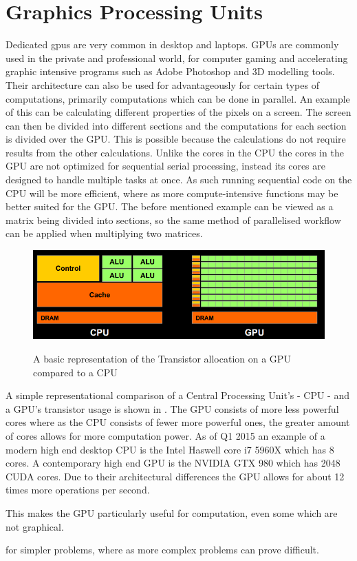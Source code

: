 \section{Graphics Processing Units}
\label{sec:GPU}
Dedicated \glspl{gpu} are very common in desktop and laptops. \citep{STEAMHW}
GPUs are commonly used in the private and professional world, for computer gaming and accelerating graphic intensive programs such as Adobe Photoshop and 3D modelling tools. \citep{NVIDIAADOBE}
Their architecture can also be used for advantageously for certain types of computations, primarily computations which can be done in parallel. 
An example of this can be calculating different properties of the pixels on a screen. 
The screen can then be divided into different sections and the computations for each section is divided over the GPU.
This is possible because the calculations do not require results from the other calculations.
Unlike the cores in the CPU the cores in the GPU are not optimized for sequential serial processing, instead its cores are designed to handle multiple tasks at once. 
As such running sequential code on the CPU will be more efficient, where as more compute-intensive functions may be better suited for the GPU.\citep{NvidiaGPGPU}
The before mentioned example can be viewed as a matrix being divided into sections, so the same method of parallelised workflow can be applied when multiplying two matrices.

\begin{figure}[h!]
\centering
 \includegraphics[width=1\textwidth]{figures/GPUCPUimage.png} %
\caption{A basic representation of the Transistor allocation on a GPU compared to a CPU}\label{image:GPUCPUimage}\citep{NvidiaCUDASeminar}
\vspace{-15pt}
\end{figure}

A simple representational comparison of a Central Processing Unit's - CPU - and a GPU's transistor usage is shown in .
The GPU consists of more less powerful cores where as the CPU consists of fewer more powerful ones, the greater amount of cores allows for more computation power.
As of Q1 2015 an example of a modern high end desktop CPU is the Intel Haswell core i7 5960X which has 8 cores. \citep{puget}
A contemporary high end GPU is the NVIDIA GTX 980 which has 2048 CUDA cores. \citep{techpowerup,gtx980}
Due to their architectural differences the GPU allows for about 12 times more operations per second.

This makes the GPU particularly useful for computation, even some which are not graphical. %



 for simpler problems, where as more complex problems can prove difficult.  